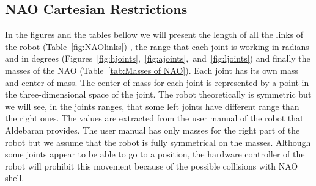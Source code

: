 \subsection{NAO Cartesian Restrictions}
In the figures and the tables bellow we will present the length of all the links of the robot (Table~\ref{fig:NAOlinks}) , the range that each joint is working in radians and in degrees (Figures~\ref{fig:hjoints},~\ref{fig:ajoints},~and~\ref{fig:ljoints}) and finally the masses of the NAO (Table~\ref{tab:Masses of NAO}). Each joint has its own mass and center of mass. The center of mass for each joint is represented by a point in the three-dimensional space of the joint. The robot theoretically is symmetric but we will see, in the joints ranges, that some left joints have different range than the right ones. The values are extracted from the user manual of the robot that Aldebaran provides.
The user manual has only masses for the right part of the robot but we assume that the robot is fully symmetrical on the masses.
Although some joints appear to be able to go to a position, the hardware controller of the robot will prohibit this movement because of the possible collisions with NAO shell.

